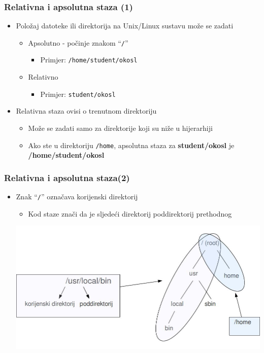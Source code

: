 \documentclass{beamer}
\newcommand{\shell}[1]{\texttt{#1}}
\begin{document}
\begin{frame}[t]
\frametitle{Relativna i apsolutna staza (1)}
\begin{itemize}
  \item Položaj datoteke ili direktorija na Unix/Linux sustavu može se
        zadati
  \begin{itemize}
    \item Apsolutno - počinje znakom ``\texttt{/}''
    \begin{itemize}
      \item[] Primjer: \texttt{/home/student/okosl}
    \end{itemize}
    \item Relativno
    \begin{itemize}
      \item[] Primjer: \texttt{student/okosl}
    \end{itemize}
  \end{itemize}

  \item Relativna staza ovisi o trenutnom direktoriju
  \begin{itemize}
    \item Može se zadati samo za direktorije koji su niže u hijerarhiji
    \item Ako ste u direktoriju \shell{/home}, apsolutna staza za
          \textbf{student/okosl} je \textbf{/home/student/okosl}
  \end{itemize}
\end{itemize}
\end{frame}

\begin{frame}[t]
\frametitle{Relativna i apsolutna staza(2)}
\begin{itemize}
  \item Znak ``\texttt{/}'' označava korijenski direktorij
  \begin{itemize}
    \item Kod staze znači da je sljedeći direktorij poddirektorij
          prethodnog
  \end{itemize}
  \centering
  \includegraphics[scale=0.3]{filetree-detail.jpg}
\end{itemize}
\end{frame}
\end{document}
